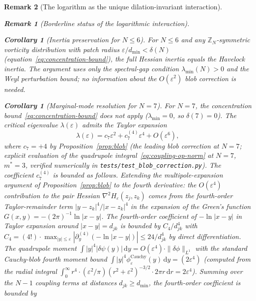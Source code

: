 \documentclass[12pt, a4paper]{article}
\newtheorem{corollary}[theorem]{Corollary}
\newtheorem{remark}{Remark}[section]
\numberwithin{equation}{section}
\newcommand{\dd}{\mathrm{d}}
\begin{document}
\begin{remark}[The logarithm as the unique dilation-invariant interaction]
\begin{remark}[Borderline status of the logarithmic interaction]
\begin{corollary}[Inertia preservation for $N \le 6$]
\label{cor:inertia-N6}
For $N \le 6$ and any $\mathbb{Z}_N$-symmetric vorticity distribution
with patch radius $\varepsilon/d_{\min} < \delta(N)$
(equation~\eqref{eq:concentration-bound}), the full Hessian inertia
equals the Havelock inertia.  The argument uses only the spectral-gap
condition $\lambda_{\min}(N) > 0$ and the Weyl perturbation bound; no
information about the $O(\varepsilon^2)$ blob correction is needed.
\end{corollary}

\begin{corollary}[Marginal-mode resolution for $N = 7$]
\label{cor:inertia-N7}
For $N = 7$, the concentration bound~\eqref{eq:concentration-bound}
does not apply ($\lambda_{\min} = 0$, so $\delta(7) = 0$).
The critical eigenvalue $\lambda(\varepsilon)$ admits the Taylor
expansion
\begin{equation}\label{eq:lambda-7-taylor}
  \lambda(\varepsilon) = c_7\varepsilon^2 + c_7^{(4)}\varepsilon^4
  + O(\varepsilon^6),
\end{equation}
where $c_7 = +4$ by Proposition~\ref{prop:blob} (the leading blob
correction at $N = 7$; explicit evaluation of the quadrupole
integral~\eqref{eq:coupling-op-norm} at $N=7$, $m^* = 3$, verified
numerically in \texttt{tests/test\_blob\_correction.py}).
The coefficient $c_7^{(4)}$ is bounded as follows.
Extending the multipole-expansion argument of
Proposition~\ref{prop:blob} to the fourth derivative:
the $O(\varepsilon^4)$ contribution to the pair Hessian
$\nabla^2 H_\varepsilon(z_j, z_k)$ comes from the fourth-order
Taylor-remainder term $|y - z_k|^4/|x-z_k|^4$ in the expansion
of the Green's function $G(x, y) = -(2\pi)^{-1}\ln|x-y|$.
The fourth-order coefficient of $-\ln|x-y|$ in Taylor expansion
around $|x-y| = d_{jk}$ is bounded by $C_4/d_{jk}^4$ with
$C_4 = (4!)\cdot\max_{|y|\le \varepsilon}|\partial_y^{(4)}(-\ln|x-y|)|
\le 24/d_{jk}^4$ by direct differentiation.
The quadrupole moment $\int|y|^4|\delta\psi(y)|\,\dd y
= O(\varepsilon^4)\cdot\|\delta\phi\|_{L^1}$
with the standard Cauchy-blob fourth moment bound
$\int|y|^4\phi^{\mathrm{Cauchy}}_\varepsilon(y)\,\dd y
= (2\varepsilon^4)$ (computed from the radial integral
$\int_0^\infty r^4\cdot(\varepsilon^2/\pi)(r^2+\varepsilon^2)^{-3/2}
\cdot 2\pi r\,\dd r = 2\varepsilon^4$).
Summing over the $N-1$ coupling terms at distances $d_{jk}
\ge d_{\min}$, the fourth-order coefficient is bounded by
\begin{equation}\label{eq:c7prime-bound}

\end{equation}
\end{corollary}
\end{remark}
\end{remark}
\end{document}
